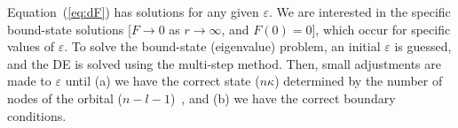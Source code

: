 \documentclass[10pt,twocolumn,a4paper]{article}%
\newcommand{\matr}[4]{\ensuremath{\begin{pmatrix}#1&#2\\#3&#4\end{pmatrix}}}	%
\newcommand{\be}{\begin{equation}}
\newcommand{\ee}{\end{equation}}
\def\en{\ensuremath{\varepsilon}}
\def\p{\ensuremath{\partial}}
\renewcommand{\k}{\ensuremath{\kappa}}
\begin{document}
%
%
%

Equation~(\ref{eq:dF}) has solutions for any given $\en$.
We are interested in the specific bound-state solutions [$F\to0$ as $r\to\infty$, and $F(0)=0$], which occur for specific values of $\en$.
To solve the bound-state (eigenvalue) problem, an initial $\en$ is guessed, and the DE is solved using the multi-step method.
Then, small adjustments are made to $\en$ until (a) we have the correct state ($n\k$) determined by the number of nodes of the orbital ($n-l-1$)~\cite{BetheBook}, and (b) we have the correct boundary conditions.
\end{document}
